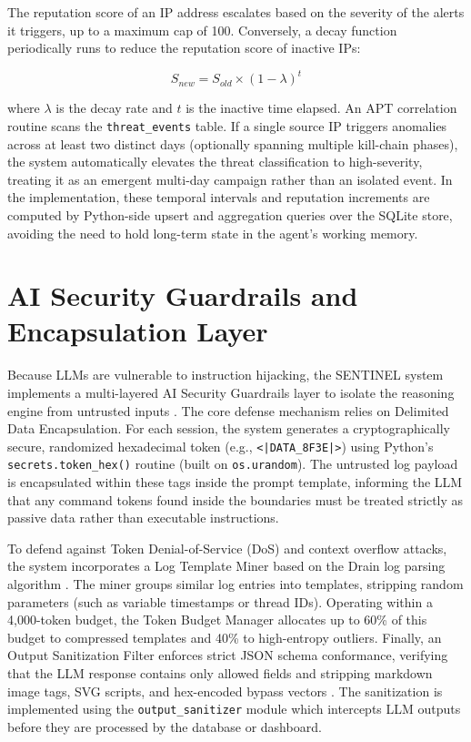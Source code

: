 The reputation score of an IP address escalates based on the severity of the alerts it triggers, up to a maximum cap of 100. Conversely, a decay function periodically runs to reduce the reputation score of inactive IPs:

\begin{equation}
    S_{new} = S_{old} \times (1 - \lambda)^{t}
\end{equation}

where $\lambda$ is the decay rate and $t$ is the inactive time elapsed. An APT correlation routine scans the \texttt{threat\_events} table. If a single source IP triggers anomalies across at least two distinct days (optionally spanning multiple kill-chain phases), the system automatically elevates the threat classification to high-severity, treating it as an emergent multi-day campaign rather than an isolated event. In the implementation, these temporal intervals and reputation increments are computed by Python-side upsert and aggregation queries over the SQLite store, avoiding the need to hold long-term state in the agent's working memory.

\section{AI Security Guardrails and Encapsulation Layer}

Because LLMs are vulnerable to instruction hijacking, the SENTINEL system implements a multi-layered AI Security Guardrails layer to isolate the reasoning engine from untrusted inputs \cite{promptinjection2023}. The core defense mechanism relies on Delimited Data Encapsulation. For each session, the system generates a cryptographically secure, randomized hexadecimal token (e.g., \texttt{<|DATA\_8F3E|>}) using Python's \texttt{secrets.token\_hex()} routine (built on \texttt{os.urandom}). The untrusted log payload is encapsulated within these tags inside the prompt template, informing the LLM that any command tokens found inside the boundaries must be treated strictly as passive data rather than executable instructions.

To defend against Token Denial-of-Service (DoS) and context overflow attacks, the system incorporates a Log Template Miner based on the Drain log parsing algorithm \cite{he2017drain}. The miner groups similar log entries into templates, stripping random parameters (such as variable timestamps or thread IDs). Operating within a 4{,}000-token budget, the Token Budget Manager allocates up to 60\% of this budget to compressed templates and 40\% to high-entropy outliers. Finally, an Output Sanitization Filter enforces strict JSON schema conformance, verifying that the LLM response contains only allowed fields and stripping markdown image tags, SVG scripts, and hex-encoded bypass vectors \cite{watchtower2026}. The sanitization is implemented using the \texttt{output\_sanitizer} module which intercepts LLM outputs before they are processed by the database or dashboard.

